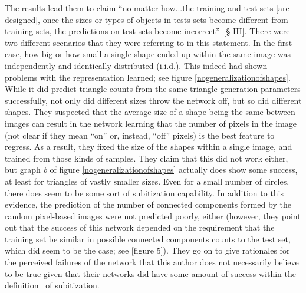 The results lead them to claim ``no matter how...the training and test sets [are designed], once the
sizes or types of objects in tests sets become different from training sets, the predictions on test
sets become incorrect''~\cite{guan2021understanding}[§ III]. There were two different scenarios that
they were referring to in this statement. In the first case, how big or how small a single shape
ended up within the same image was independently and identically distributed (i.i.d.). This indeed
had shown problems with the representation learned; see figure \ref{nogeneralizationofshapes}. While
it did predict triangle counts from the same triangle generation parameters successfully, not only
did different sizes throw the network off, but so did different shapes. They suspected that the
average size of a shape being the same between images can result in the network learning that the
number of pixels in the image (not clear if they mean ``on'' or, instead, ``off'' pixels) is the
best feature to regress. As a result, they fixed the size of the shapes within a single image,
and trained from those kinds of samples. They claim that this did not work either, but graph
\textit{b} of figure \ref{nogeneralizationofshapes} actually does show some success, at least for triangles
of vastly smaller sizes. Even for a small number of circles, there does seem to be some sort of
subitization capability. In addition to this evidence, the prediction of the number of connected
components formed by the random pixel-based images were not predicted poorly, either (however, they
point out that the success of this network depended on the requirement that the training set be
similar in possible connected components counts to the test set, which did seem to be the case; see
\cite{guan2021understanding}[figure 5]). They go on to give rationales for the perceived failures of
the network that this author does not necessarily believe to be true given that their networks did
have some amount of success within the definition~\cite{Zhang_2015_CVPR} of subitization.
